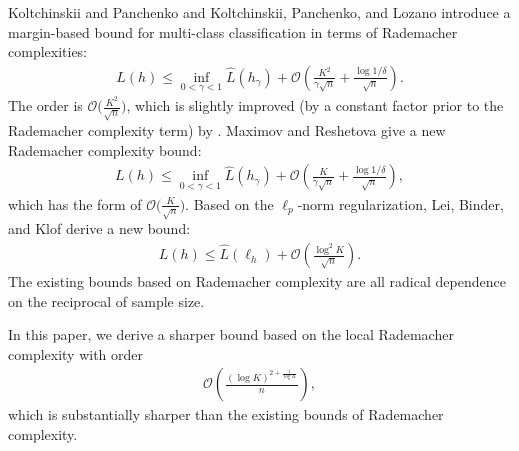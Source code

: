 \documentclass{article}
\begin{document}
Koltchinskii and Panchenko 
and Koltchinskii, Panchenko, and Lozano 
introduce a margin-based bound for multi-class classification in terms of Rademacher complexities:
\begin{align*}
  L(h)\leq \inf_{0<\gamma<1}\hat{L}(h_\gamma)+\mathcal{O}\left(\frac{K^2}{\gamma\sqrt{n}}+\frac{\log1/\delta}{\sqrt{n}}\right).
\end{align*}
The order is $\mathcal{O}\big(\frac{K^2}{\sqrt{n}}\big)$,
which is slightly improved (by a constant factor prior to the Rademacher complexity term)
by \cite{mohri2012foundations,cortes2013multi}.
Maximov and Reshetova  give a new Rademacher complexity bound:
\begin{align*}
  L(h)\leq \inf_{0<\gamma<1}\hat{L}(h_\gamma)+\mathcal{O}
  \left(\frac{K}{\gamma\sqrt{n}}+\frac{\log1/\delta}{\sqrt{n}}\right),
\end{align*}
which has the form of $\mathcal{O}\big(\frac{K}{\sqrt{n}}\big)$.
Based on the $\ell_p$-norm regularization,
Lei, Binder, and Klof  derive a new bound:
\begin{align*}
   L(h)\leq  \hat{L}(\ell_h) +\mathcal{O}\left(\frac{\log^2 K}{\sqrt{n}}\right).
\end{align*}
The existing bounds based on Rademacher complexity are all radical dependence
on the reciprocal of sample size.

In this paper,
we derive a sharper bound based on the local Rademacher complexity with order
\begin{align*}
\mathcal{O}\left(\frac{(\log K)^{2+\frac{1}{\log K}}}{n}\right),
\end{align*}
which is substantially sharper
than the existing bounds of  Rademacher complexity.
\end{document}
